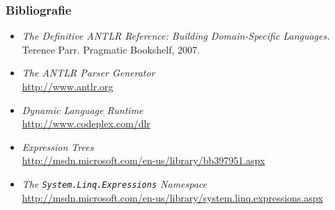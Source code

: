 \documentclass{beamer}
\begin{document}
\begin{frame}
  \frametitle{Bibliografie}
  \begin{itemize}
  \item
    \emph{The Definitive ANTLR Reference: Building Domain-Specific Languages.}
    Terence Parr. Pragmatic Bookshelf, 2007.
  \item
    \emph{The ANTLR Parser Generator}
    \\\url{http://www.antlr.org}
  \item 
    \emph{Dynamic Language Runtime}
    \\\url{http://www.codeplex.com/dlr}
  \item
    \emph{Expression Trees}
    \\\mbox{\url{http://msdn.microsoft.com/en-us/library/bb397951.aspx}}
  \item
    \emph{The \texttt{System.Linq.Expressions} Namespace}
    \\\url{http://msdn.microsoft.com/en-us/library/system.linq.expressions.aspx}

  \end{itemize}
\end{frame}
\end{document}
